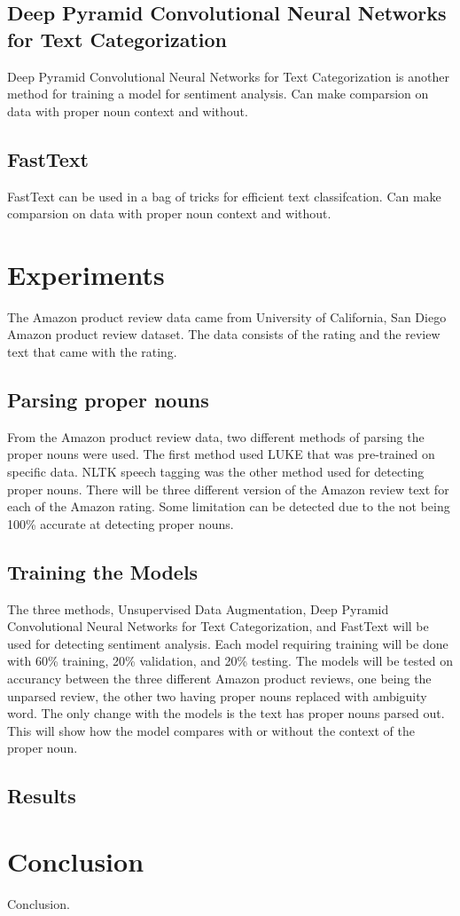 \documentclass[11pt,a4paper]{article}
\begin{document}
\subsection{Deep Pyramid Convolutional Neural Networks for Text Categorization}

Deep Pyramid Convolutional Neural Networks for Text Categorization is another method for training a model for sentiment analysis. Can make comparsion on data with proper noun context and without.

\subsection{FastText}

FastText can be used in a bag of tricks for efficient text classifcation. Can make comparsion on data with proper noun context and without.

\section{Experiments}

The Amazon product review data came from University of California, San Diego Amazon product review dataset. The data consists of the rating and the review text that came with the rating.

\subsection{Parsing proper nouns}

From the Amazon product review data, two different methods of parsing the proper nouns were used. The first method used LUKE that was pre-trained on specific data. NLTK speech tagging was the other method used for detecting proper nouns. There will be three different version of the Amazon review text for each of the Amazon rating. Some limitation can be detected due to the not being 100\% accurate at detecting proper nouns.

\subsection{Training the Models}

The three methods, Unsupervised Data Augmentation, Deep Pyramid Convolutional Neural
Networks for Text Categorization, and FastText will be used for detecting sentiment analysis. Each model requiring training will be done with 60\% training, 20\% validation, and 20\% testing. The models will be tested on accurancy between the three different Amazon product reviews, one being the unparsed review, the other two having proper nouns replaced with ambiguity word. The only change with the models is the text has proper nouns parsed out. This will show how the model compares with or without the context of the proper noun.

\subsection{Results}

\section{Conclusion}

Conclusion.



\end{document}
